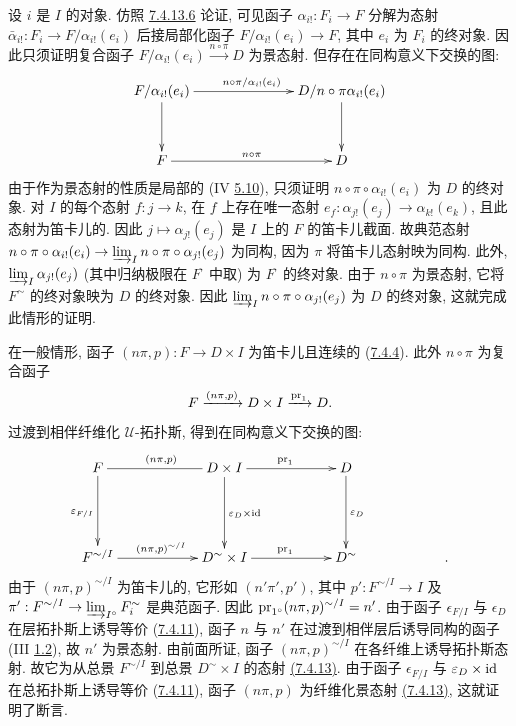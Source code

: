 设 $i$ 是 $I$ 的对象.
仿照 \hyperref[VI.par7.4.13.6]{7.4.13.6} 论证,
可见函子 $\alpha_{i!}:F_i\to F$ 分解为态射
$\bar{\alpha}_{i!}:F_i\to F/\alpha_{i!}(e_i)$
后接局部化函子 $F/\alpha_{i!}(e_i)\to F$,
其中 $e_i$ 为 $F_i$ 的终对象.
因此只须证明复合函子
$F/\alpha_{i!}(e_i)\xrightarrow{n\circ\pi}D$ 为景态射.
但存在在同构意义下交换的图:
\[
\xymatrix@C=2.5cm@R=1.25cm{
F/\alpha_{i!}(e_i) \ar[d]\ar[r]^{n\circ
  \pi/\alpha_{i!}(e_i)}& D/n\circ \pi \alpha_{i!}(e_i) \ar[d]\\
F \ar[r]^{n\circ \pi}& D
}
\]
由于\pageoriginale{}作为景态射的性质是局部的
(IV \hyperref[IV.subsec5.10]{5.10}),
只须证明 $n\circ\pi\circ\alpha_{i!}(e_i)$ 为 $D$ 的终对象.
对 $I$ 的每个态射 $f:j\to k$,
在 $f$ 上存在唯一态射
$e_f:\alpha_{j!}(e_j)\to\alpha_{k!}(e_k)$,
且此态射为笛卡儿的.
因此 $j\mapsto\alpha_{j!}(e_j)$
是 $I$ 上的 $F$ 的笛卡儿截面.
故典范态射
$n\circ\pi\circ\alpha_{i!}(e_i)\to
\varinjlim_I n\circ\pi\circ\alpha_{j!}(e_j)$ 为同构,
因为 $\pi$ 将笛卡儿态射映为同构.
此外, $\varinjlim_I\alpha_{j!}(e_j)$
(其中归纳极限在 $F^{\widehat{\phantom{,}}}$ 中取)
为 $F^{\widehat{\phantom{,}}}$ 的终对象.
由于 $n\circ\pi$ 为景态射,
它将 $F^{\sim}$ 的终对象映为 $D$ 的终对象.
因此 $\varinjlim_I n\circ\pi\circ\alpha_{j!}(e_j)$
为 $D$ 的终对象, 这就完成此情形的证明.

在一般情形, 函子 $(n\pi,p):F\to D\times I$
为笛卡儿且连续的 (\hyperref[VI.prop7.4.4]{7.4.4}).
此外 $n\circ\pi$ 为复合函子
$$
F \xrightarrow{(n \pi, p)} D \times I \xrightarrow{\operatorname{pr}_1} D{}.
$$
过渡到相伴纤维化 $𝒰$-拓扑斯,
得到在同构意义下交换的图:
\[
\xymatrix@C=2cm@R=1.75cm{
F       \ar@{-}[r]^{(n\pi,p)} \ar[d]_{\varepsilon_{F/I}}& D\times I
\ar[r]^{\pr_1}\ar[d]^{\varepsilon_D\times \id} & D \ar[d]^{\varepsilon_D}\\
F^{\sim/I}  \ar[r]^{(n\pi,p)^{\sim/I}} & D^{\sim}\times I \ar[r]^{\pr_1} & D^{\sim}&.
}
\]
由于 $(n\pi,p)^{\sim/I}$ 为笛卡儿的,
它形如 $(n'\pi',p')$,
其中 $p':F^{\sim/I}\to I$ 及
$\pi':F^{\sim/I}\to\varinjlim_{I^{\circ}}F^{\sim}_i$
是典范函子.
因此 $\operatorname{pr}_{1^{\circ}}(n\pi,p)^{\sim/I}=n'$.
由于函子 $\epsilon_{F/I}$ 与 $\epsilon_D$
在层拓扑斯上诱导等价 (\hyperref[VI.cor7.4.11]{7.4.11}),
函子 $n$ 与 $n'$ 在过渡到相伴层后诱导同构的函子
(III \hyperref[III.prop1.2]{1.2}),
故 $n'$ 为景态射.
由前面所证,\pageoriginale{}
函子 $(n\pi,p)^{\sim/I}$ 在各纤维上诱导拓扑斯态射.
故它为从总景 $F^{\sim/I}$ 到总景 $D^{\sim}\times I$ 的态射
\hyperref[VI.thm7.4.13.1]{(7.4.13)}.
由于函子 $\epsilon_{F/I}$ 与 $\varepsilon_D\times\operatorname{id}$
在总拓扑斯上诱导等价 (\hyperref[VI.cor7.4.11]{7.4.11}),
函子 $(n\pi,p)$ 为纤维化景态射
\hyperref[VI.thm7.4.13.1]{(7.4.13)}, 这就证明了断言.

